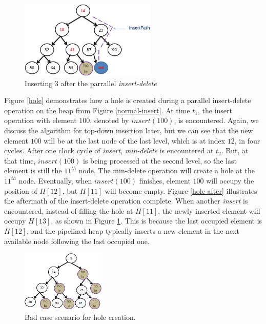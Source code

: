 \begin{figure}[!ht]
  \centering
  \includegraphics[width=6.5cm]{fig/normal-insert-delete-2.png}
      \caption{Inserting $3$ after the parrallel {\it insert-delete}}
    \label{skiphole}
\end{figure}

Figure \ref{hole} demonstrates how a hole is created during a parallel insert-delete operation on the heap from Figure \ref{normal-insert}.
At time $t_1$, the insert operation with element $100$, denoted by $insert(100)$, is encountered.
Again, we discuss the algorithm for top-down insertion later, but we can see that the new element $100$ will be at the last node of the last level, which is at index $12$, in four cycles.
After one clock cycle of {\it insert}, {\it min-delete} is encountered at $t_2$.
But, at that time, $insert(100)$ is being processed at the second level, so the last element is still the $11^{th}$ node.
The min-delete operation will create a hole at the $11^{th}$ node.
Eventually, when $insert(100)$ finishes, element $100$ will occupy the position of $H[12]$, but $H[11]$ will become empty.
Figure \ref{hole-after} illustrates the aftermath of the insert-delete operation complete.
When another {\it insert} is encountered, instead of filling the hole at $H[11]$, the newly inserted element will occupy $H[13]$, as shown in Figure \ref{skiphole}. 
This is because the last occupied element is $H[12]$, and the pipelined heap typically inserts a new element in the next available node following the last occupied one.

\begin{figure}[!ht]
  \centering
  \includegraphics[width=4cm]{fig/hole.png}
      \caption{Bad case scenario for hole creation.}
    \label{badcase}
\end{figure}

